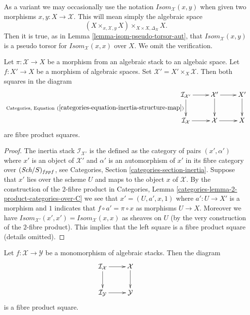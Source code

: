 \noindent
As a variant we may occasionally use the notation
$\mathit{Isom}_\mathcal{X}(x, y)$ when given two morphisms
$x, y : X \to \mathcal{X}$. This will mean simply the algebraic
space
$$
(X \times_{x, \mathcal{X}, y} X) \times_{X \times X, \Delta_X} X.
$$
Then it is true, as in
Lemma \ref{lemma-isom-pseudo-torsor-aut},
that $\mathit{Isom}_\mathcal{X}(x, y)$ is a pseudo torsor for
$\mathit{Isom}_\mathcal{X}(x, x)$ over $X$. We omit the verification.

\begin{lemma}
\label{lemma-cartesian-square-intertia}
Let $\pi : \mathcal{X} \to X$ be a morphism from an algebraic stack to
an algebaic space. Let $f : X' \to X$ be a morphism of algebraic spaces.
Set $\mathcal{X}' = X' \times_X \mathcal{X}$. Then both squares in
the diagram
$$
\xymatrix{
\mathcal{I}_{\mathcal{X}'} \ar[r]
\ar[d]_{
\text{Categories, Equation}\ (\ref{categories-equation-inertia-structure-map})
} &
\mathcal{X}' \ar[r] \ar[d] & X' \ar[d] \\
\mathcal{I}_\mathcal{X} \ar[r] &
\mathcal{X} \ar[r] & X
}
$$
are fibre product squares.
\end{lemma}

\begin{proof}
The inertia stack $\mathcal{I}_{\mathcal{X}'}$ is the defined as the
category of pairs $(x', \alpha')$ where $x'$ is an object of $\mathcal{X}'$
and $\alpha'$ is an automorphism of $x'$ in its fibre category over
$(\textit{Sch}/S)_{fppf}$, see
Categories, Section \ref{categories-section-inertia}.
Suppose that $x'$ lies over the scheme $U$ and maps to the object
$x$ of $\mathcal{X}$. By the construction of the $2$-fibre product in
Categories, Lemma \ref{categories-lemma-2-product-categories-over-C}
we see that $x' = (U, a', x, 1)$ where $a' : U \to X'$ is a morphism
and $1$ indicates that $f \circ a' = \pi \circ x$ as morphisms $U \to X$.
Moreover we have
$\mathit{Isom}_{\mathcal{X}'}(x', x') = \mathit{Isom}_\mathcal{X}(x, x)$
as sheaves on $U$ (by the very construction of the $2$-fibre product).
This implies that the left square is a fibre product square (details omitted).
\end{proof}

\begin{lemma}
\label{lemma-monomorphism-cartesian-square-inertia}
Let $f : \mathcal{X} \to \mathcal{Y}$ be a monomorphism of algebraic stacks.
Then the diagram
$$
\xymatrix{
\mathcal{I}_\mathcal{X} \ar[r] \ar[d] &
\mathcal{X} \ar[d] & \\
\mathcal{I}_\mathcal{Y} \ar[r] &
\mathcal{Y}
}
$$
is a fibre product square.
\end{lemma}


